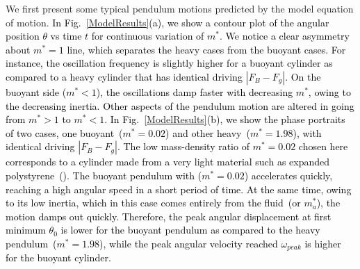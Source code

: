 \documentclass{jfm}
\begin{document}
{\color{black}We first present some typical pendulum motions predicted by the model equation of motion.}
\textcolor{black}{In Fig.~\ref{ModelResults}(a), we show a contour plot of the angular position $\theta$ vs time $t$  for continuous variation of $m^*$. We notice a clear asymmetry about $m^* = 1$ line, which separates the heavy cases from the buoyant cases. 
For instance, the oscillation frequency is slightly higher for a buoyant cylinder as compared to a heavy cylinder that has identical driving $|{F_B} - {F_g}|$. On the buoyant side ($m^* <1$), the oscillations damp faster with decreasing $m^*$, owing to the decreasing inertia. Other aspects of the pendulum motion are altered in going from $m^*>1$ to $m^*<1$. In Fig.~\ref{ModelResults}(b), we show the phase portraits of two cases, one buoyant~{\color{black}($m^* = 0.02$)} and other heavy~{\color{black}($m^* = 1.98$)}, with identical driving $|{F_B} - {F_g}|$.  {\color{black}The low mass-density ratio of $m^* = 0.02$ chosen here corresponds to a cylinder made from a very light material such as expanded polystyrene~(\cite{mathai2015wake}).} The buoyant pendulum with ($m^* = 0.02$) accelerates quickly, reaching a high angular speed in a short period of time. At the same time, owing to its low inertia, which in this case comes entirely from the fluid~(or $m_a^*$), the motion damps out quickly. Therefore, the peak angular displacement at first minimum $\theta_0$ is lower for the buoyant pendulum as compared to the heavy pendulum~($m^* = 1.98$), while the peak angular velocity reached $\omega_{peak}$ is higher for the buoyant cylinder.} 




%
\end{document}
